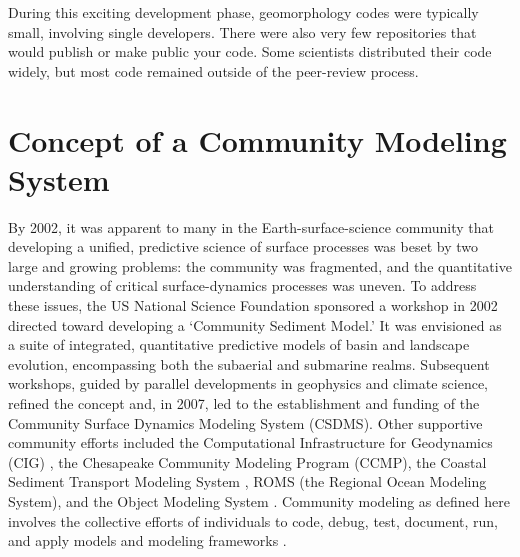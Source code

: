 \documentclass[10pt,twocolumn,preprint]{elsarticle}
\begin{document}
During this exciting development phase, geomorphology codes were typically small, involving single developers. There were also very few repositories that would publish or make public your code. Some scientists distributed their code widely, but most code remained outside of the peer-review process.

\section{Concept of a Community Modeling System}
   
By 2002, it was apparent to many in the Earth-surface-science community that developing a unified, predictive science of surface processes was beset by two large and growing problems: the community was fragmented, and the quantitative understanding of critical surface-dynamics processes was uneven. To address these issues, the US National Science Foundation sponsored a workshop in 2002 directed toward developing a `Community Sediment Model.' It was envisioned as a suite of integrated, quantitative predictive models of basin and landscape evolution, encompassing both the subaerial and submarine realms. Subsequent workshops, guided by parallel developments in geophysics and climate science, refined the concept and, in 2007, led to the establishment and funding of the Community Surface Dynamics Modeling System (CSDMS). Other supportive community efforts included the Computational Infrastructure for Geodynamics (CIG) \citep{kellogg2018role}, the Chesapeake Community Modeling Program (CCMP), the Coastal Sediment Transport Modeling System \citep{warner2008development}, ROMS (the Regional Ocean Modeling System), and the Object Modeling System \citep{david2013software}. Community modeling as defined here involves the collective efforts of individuals to code, debug, test, document, run, and apply models and modeling frameworks \citep{voinov2010community}.
\end{document}
